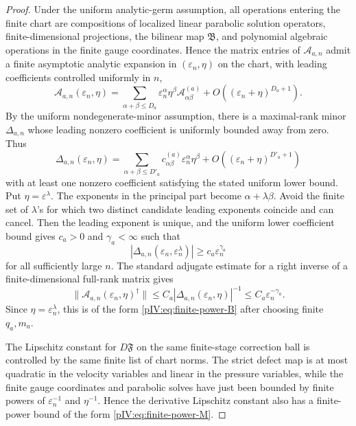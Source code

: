 \documentclass[11pt]{article}
\numberwithin{equation}{section}
\theoremstyle{plain}
\theoremstyle{definition}
\theoremstyle{remark}
\newcommand{\calB}{\mathfrak B}
\begin{document}
\begin{proof}
Under the uniform analytic-germ assumption, all operations entering the finite chart are compositions of localized linear parabolic solution operators, finite-dimensional projections, the bilinear map \(\calB\), and polynomial algebraic operations in the finite gauge coordinates. Hence the matrix entries of \(\mathcal A_{a,n}\) admit a finite asymptotic analytic expansion in \((\varepsilon_n,\eta)\) on the chart, with leading coefficients controlled uniformly in \(n\),
\[
        \mathcal A_{a,n}(\varepsilon_n,
        \eta)
        =
        \sum_{\alpha+\beta\le D_a}
        \varepsilon_n^\alpha\eta^\beta
        \mathcal A^{(a)}_{\alpha\beta}
        +O((\varepsilon_n+\eta)^{D_a+1}).
\]
By the uniform nondegenerate-minor assumption, there is a maximal-rank minor \(\Delta_{a,n}\) whose leading nonzero coefficient is uniformly bounded away from zero. Thus
\[
        \Delta_{a,n}(\varepsilon_n,
        \eta)
        =
        \sum_{\alpha+\beta\le D'_a}
        c^{(a)}_{\alpha\beta}
        \varepsilon_n^\alpha\eta^\beta
        +O((\varepsilon_n+\eta)^{D'_a+1})
\]
with at least one nonzero coefficient satisfying the stated uniform lower bound. Put \(\eta=\varepsilon^\lambda\). The exponents
in the principal part become \(\alpha+\lambda\beta\). Avoid the finite set of
\(\lambda\)'s for which two distinct candidate leading exponents coincide and can
cancel. Then the leading exponent is unique, and the uniform lower coefficient bound gives \(c_a>0\) and \(\gamma_a<\infty\) such that
\[
        |\Delta_{a,n}(\varepsilon_n,
        \varepsilon_n^\lambda)|
        \ge c_a\varepsilon_n^{\gamma_a}
\]
for all sufficiently large \(n\). The standard adjugate estimate for a right inverse of
a finite-dimensional full-rank matrix gives
\[
        \|\mathcal A_{a,n}(\varepsilon_n,
        \eta)^\dagger\|
        \le C_a |\Delta_{a,n}(\varepsilon_n,
        \eta)|^{-1}
        \le C_a\varepsilon_n^{-\gamma_a}.
\]
Since \(\eta=\varepsilon_n^\lambda\), this is of the form
\eqref{pIV:eq:finite-power-B} after choosing finite \(q_a,m_a\).

The Lipschitz constant for \(D\mathfrak F\) on the same finite-stage correction ball is controlled
by the same finite list of chart norms. The strict defect map is at most quadratic in
the velocity variables and linear in the pressure variables, while the finite gauge
coordinates and parabolic solves have just been bounded by finite powers of
\(\varepsilon_n^{-1}\) and \(\eta^{-1}\). Hence the derivative Lipschitz constant also
has a finite-power bound of the form \eqref{pIV:eq:finite-power-M}.
\end{proof}
\end{document}
